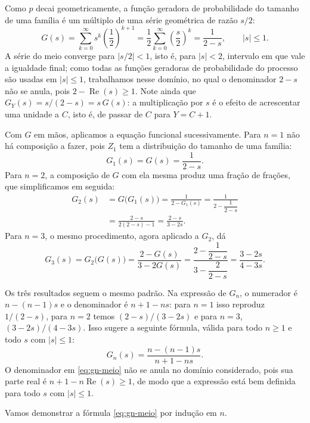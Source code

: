 \documentclass[12pt,portuguese]{article}
\theoremstyle{definition}
\theoremstyle{plainexercise}
\theoremstyle{starredexercise}
\theoremstyle{definition}
\begin{document}
Como $p$ decai geometricamente, a função geradora de probabilidade do
tamanho de uma família é um múltiplo de uma série geométrica de razão $s/2$:
\begin{equation}\label{eq:fgp-geometrica-meio}
G(s)=\sum_{k=0}^{\infty}s^k\left(\frac{1}{2}\right)^{k+1}
=\frac{1}{2}\sum_{k=0}^{\infty}\left(\frac{s}{2}\right)^{k}
=\frac{1}{2-s},
\qquad |s|\leqslant 1.
\end{equation}
A série do meio converge para $|s/2|<1$, isto é, para $|s|<2$, intervalo em que
vale a igualdade final; como todas as funções geradoras de probabilidade do
processo são usadas em $|s|\leqslant 1$, trabalhamos nesse domínio, no qual o
denominador $2-s$ não se anula, pois $2-\operatorname{Re}(s)\geqslant 1$. Note ainda que
$G_Y(s)=s/(2-s)=s\,G(s)$: a multiplicação por $s$ é o efeito de acrescentar
uma unidade a $C$, isto é, de passar de $C$ para $Y=C+1$.

Com $G$ em mãos, aplicamos a equação funcional sucessivamente. Para $n=1$ não
há composição a fazer, pois $Z_1$ tem a distribuição do tamanho de uma família:
\[
G_1(s)=G(s)=\frac{1}{2-s}.
\]
Para $n=2$, a composição de $G$ com ela mesma produz uma fração de frações, que
simplificamos em seguida:
\begin{align*}
G_2(s)
&=G\bigl(G_1(s)\bigr)
=\frac{1}{2-G_1(s)}
=\frac{1}{2-\dfrac{1}{2-s}}
\\[0.3cm]
&=\frac{2-s}{2(2-s)-1}
=\frac{2-s}{3-2s}.
\end{align*}
Para $n=3$, o mesmo procedimento, agora aplicado a $G_2$,
dá
\[
G_3(s)
=G_2\bigl(G(s)\bigr)
=\frac{2-G(s)}{3-2G(s)}
=\frac{2-\dfrac{1}{2-s}}{3-\dfrac{2}{2-s}}
=\frac{3-2s}{4-3s}.
\]

Os três resultados seguem o mesmo padrão. Na expressão de $G_n$, o numerador é
$n-(n-1)s$ e o denominador é $n+1-ns$: para $n=1$ isso reproduz $1/(2-s)$,
para $n=2$ temos $(2-s)/(3-2s)$ e para $n=3$, $(3-2s)/(4-3s)$. Isso sugere a
seguinte fórmula, válida para todo $n\geqslant 1$ e todo $s$ com $|s|\leqslant 1$:
\begin{equation}\label{eq:gn-meio}
G_n(s)=\frac{n-(n-1)s}{n+1-ns}.
\end{equation}
O denominador em \eqref{eq:gn-meio} não se anula no domínio considerado, pois
sua parte real é $n+1-n\operatorname{Re}(s)\geqslant 1$, de modo que a
expressão está bem definida para todo $s$ com $|s|\leqslant 1$.

Vamos demonstrar a fórmula \eqref{eq:gn-meio} por indução em $n$.
\end{document}
